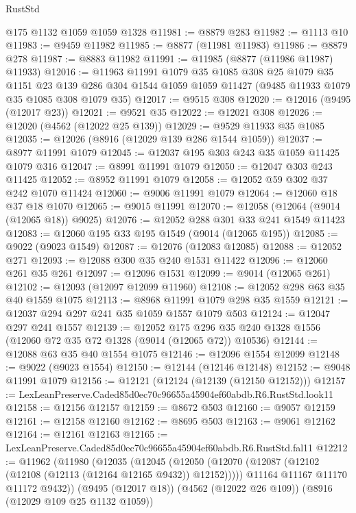 \begin{lexlean}{RustStd}
\begin{coremodule}
    @175
    @1132
    @1059
    @1059
    @1328
@11981 := @8879 @283
@11982 := @1113 @10
@11983 := @9459 @11982
@11985 := @8877 (@11981 @11983)
@11986 := @8879 @278
@11987 := @8883 @11982
@11991 := @11985 (@8877 (@11986 @11987) @11933)
@12016 := @11963
    @11991
    @1079
    @35
    @1085
    @308
    @25
    @1079
    @35
    @1151
    @23
    @139
    @286
    @304
    @1544
    @1059
    @1059
    @11427
    (@9485 @11933 @1079 @35 @1085 @308 @1079 @35)
@12017 := @9515 @308
@12020 := @12016 (@9495 (@12017 @23))
@12021 := @9521 @35
@12022 := @12021 @308
@12026 := @12020 (@4562 (@12022 @25 @139))
@12029 := @9529 @11933 @35 @1085
@12035 := @12026 (@8916 (@12029 @139 @286 @1544 @1059))
@12037 := @8977 @11991 @1079
@12045 := @12037 @195 @303 @243 @35 @1059 @11425 @1079 @316
@12047 := @8991 @11991 @1079
@12050 := @12047 @303 @243 @11425
@12052 := @8952 @11991 @1079
@12058 := @12052 @59 @302 @37 @242 @1070 @11424
@12060 := @9006 @11991 @1079
@12064 := @12060 @18 @37 @18 @1070
@12065 := @9015 @11991
@12070 := @12058 (@12064 (@9014 (@12065 @18)) @9025)
@12076 := @12052 @288 @301 @33 @241 @1549 @11423
@12083 := @12060 @195 @33 @195 @1549 (@9014 (@12065 @195))
@12085 := @9022 (@9023 @1549)
@12087 := @12076 (@12083 @12085)
@12088 := @12052 @271
@12093 := @12088 @300 @35 @240 @1531 @11422
@12096 := @12060 @261 @35 @261
@12097 := @12096 @1531
@12099 := @9014 (@12065 @261)
@12102 := @12093 (@12097 @12099 @11960)
@12108 := @12052 @298 @63 @35 @40 @1559 @1075
@12113 := @8968 @11991 @1079 @298 @35 @1559
@12121 := @12037 @294 @297 @241 @35 @1059 @1557 @1079 @503
@12124 := @12047 @297 @241 @1557
@12139 := @12052
    @175
    @296
    @35
    @240
    @1328
    @1556
    (@12060 @72 @35 @72 @1328 (@9014 (@12065 @72)) @10536)
@12144 := @12088 @63 @35 @40 @1554 @1075
@12146 := @12096 @1554 @12099
@12148 := @9022 (@9023 @1554)
@12150 := @12144 (@12146 @12148)
@12152 := @9048 @11991 @1079
@12156 := @12121 (@12124 (@12139 (@12150 @12152)))
@12157 := LexLeanPreserve.Caded85d0ec70c96655a45904ef60abdb.R6.RustStd.look11
@12158 := @12156 @12157
@12159 := @8672 @503
@12160 := @9057 @12159
@12161 := @12158 @12160
@12162 := @8695 @503
@12163 := @9061 @12162
@12164 := @12161 @12163
@12165 := LexLeanPreserve.Caded85d0ec70c96655a45904ef60abdb.R6.RustStd.fal11
@12212 := @11962
    (@11980
      (@12035
        (@12045
          (@12050 (@12070 (@12087 (@12102 (@12108 (@12113 (@12164 @12165 @9432)) @12152)))))
          @11164
          @11167
          @11170
          @11172
          @9432))
      (@9495 (@12017 @18))
      (@4562 (@12022 @26 @109))
      (@8916 (@12029 @109 @25 @1132 @1059))

\end{coremodule}
\end{lexlean}
